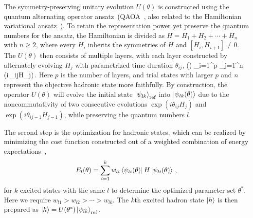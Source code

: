 \documentclass[aps,prl,twocolumn,superscriptaddress,notitlepage,nofootinbib]{revtex4-1}
\def\bea#1\eea{\begin{align}#1\end{align}}
\newcommand{\old}[1]{{\color{red}\sout{#1}}}
\begin{document}
The symmetry-preserving unitary evolution $U(\theta)$ is constructed using the quantum alternating operator ansatz~(QAOA~\cite{farhi2014quantum}, also related to the Hamiltonian variational ansatz~\cite{wiersema-PRXQuantum2020}). To retain the representation power yet preserve the quantum numbers for the ansatz, the Hamiltonian is divided as $H=H_1+H_2+\cdots + H_n$ with $n\ge2$, where every $H_i$ inherits the symmetries of $H$ and $[H_i,H_{i+1}]\not=0$. The $U(\theta)$ then consists of multiple layers, with each layer constructed by alternately evolving $H_j$ with parametrized time duration $\theta_{ij}$,
\setlength{\abovedisplayskip}{4.95pt}
\setlength{\belowdisplayskip}{4.95pt}
\bea
U(\theta) \equiv \prod_{i=1}^p \prod_{j=1}^n
\exp(i\,\theta_{ij}H_j)\,.
\eea
Here $p$ is the number of layers, and trial states with larger $p$ and $n$ represent the objective hadronic state more faithfully. 
By construction, the operator $U(\theta)$ will evolve the initial state $\ket{\psi_{lk}}_{\rm ref}$ into 
$\ket{\psi_{lk}(\theta)}$ due to the noncommutativity of two consecutive evolutions $\exp(i\theta_{ij}H_j)$ and $\exp(i \theta_{ij-1}H_{j-1})$, while preserving the quantum numbers $l$. 

The second step is the optimization for hadronic states, which can be realized by
minimizing the cost function constructed out of a weighted combination of energy expectations~\cite{nakanishi_19},
\begin{equation}
	E_l(\theta)=\sum_{i=1}^k w_{li} \bra{\psi_{li} (\theta)}H\ket{\psi_{li} (\theta)} \,,
\end{equation}
for $k$ excited states with the same $l$
to determine the optimized parameter set $\theta^\ast$.
Here we require $w_{l1}>w_{l2}>\cdots>w_{lk}$. 
The $k$th excited hadron state $\ket{h}$ is then prepared as
$\ket{h} =
U(\theta^\ast)
\ket{ \psi_{lk} }_{\rm ref}$. 
\end{document}
